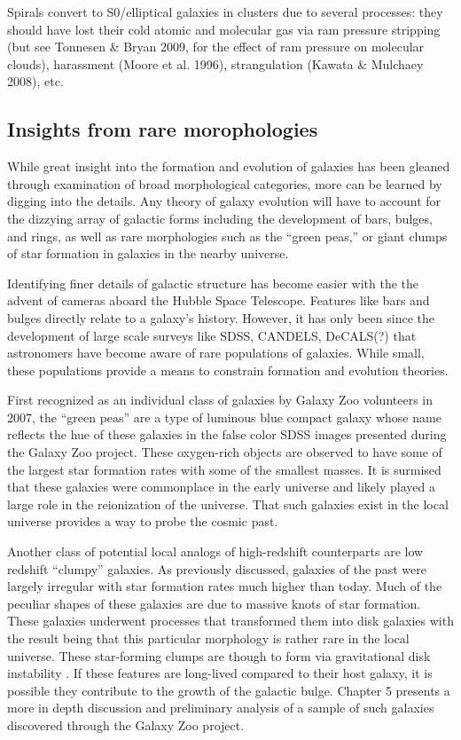 Spirals convert to S0/elliptical galaxies in clusters due to several processes: they should have lost their cold atomic and molecular gas via ram pressure stripping (but see Tonnesen \& Bryan 2009, for the effect of ram
pressure on molecular clouds), harassment (Moore et al. 1996),
strangulation (Kawata \& Mulchaey 2008), etc.



\subsection{Insights from rare morophologies}
While great insight into the formation and evolution of galaxies has been gleaned through examination of broad morphological categories, more can be learned by digging into the details. Any theory of galaxy evolution will have to account for the dizzying array of galactic forms including the development of bars, bulges, and rings, as well as rare morphologies such as the ``green peas,'' or giant clumps of star formation in galaxies in the nearby universe.

Identifying finer details of galactic structure has become easier with the the advent of cameras aboard the Hubble Space Telescope. Features like bars and bulges directly relate to a galaxy's history. However, it has only been since the development of large scale surveys like SDSS, CANDELS, DeCALS(?) that astronomers have become aware of rare populations of galaxies. While small, these populations provide a means to constrain formation and evolution theories. 

First recognized as an individual class of galaxies by Galaxy Zoo volunteers in 2007, the ``green peas'' are a type of luminous blue compact galaxy whose name reflects the hue of these galaxies in the false color SDSS images presented during the Galaxy Zoo project. These oxygen-rich objects are observed to have some of the largest star formation rates with some of the smallest masses. It is surmised that these galaxies were commonplace in the early universe and likely played a large role in the reionization of the universe. That such galaxies exist in the local universe provides a way to probe the cosmic past. 

Another class of potential local analogs of high-redshift counterparts are low redshift ``clumpy'' galaxies. As previously discussed, galaxies of the past were largely irregular with star formation rates much higher than today. Much of the peculiar shapes of these galaxies are due to massive knots of star formation. These galaxies underwent processes that transformed them into disk galaxies with the result being that this particular morphology is rather rare in the local universe. These star-forming clumps are though to form via gravitational disk instability \citep{Toomre???}. If these features are long-lived compared to their host galaxy, it is possible they contribute to the growth of the galactic bulge. Chapter 5 presents a more in depth discussion and preliminary analysis of a sample of such galaxies discovered through the Galaxy Zoo project.


